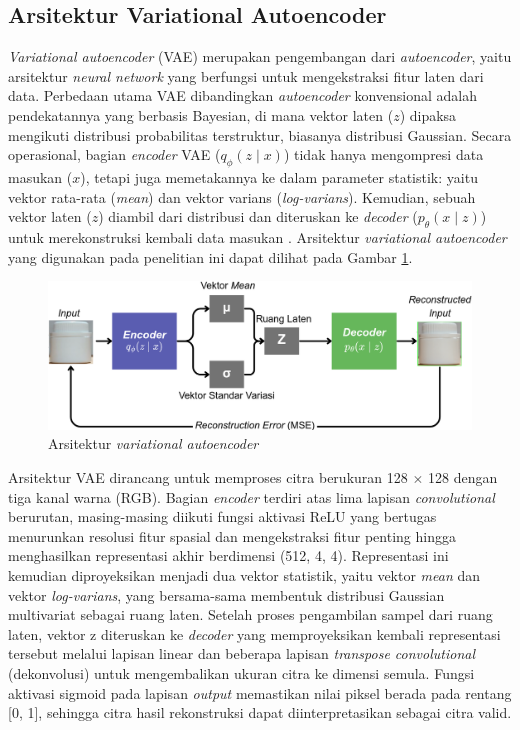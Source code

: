 \subsection{Arsitektur Variational Autoencoder}
\textit{Variational autoencoder} (VAE) merupakan pengembangan dari
\textit{autoencoder}, yaitu arsitektur \textit{neural network}
yang berfungsi untuk mengekstraksi fitur laten dari data. Perbedaan
utama VAE dibandingkan \textit{autoencoder} konvensional adalah
pendekatannya yang berbasis Bayesian, di mana vektor laten ($z$)
dipaksa mengikuti distribusi probabilitas terstruktur, biasanya
distribusi Gaussian. Secara operasional, bagian \textit{encoder} VAE
($q_{\phi}(z \mid x)$) tidak hanya mengompresi data masukan ($x$),
tetapi juga memetakannya ke dalam parameter statistik: yaitu vektor
rata-rata (\textit{mean}) dan vektor varians (\textit{log-varians}).
Kemudian, sebuah vektor laten ($z$) diambil dari distribusi dan
diteruskan ke \textit{decoder} ($p_{\theta}(x \mid z)$) untuk
merekonstruksi kembali data masukan \citep{25}. Arsitektur
\textit{variational autoencoder} yang
digunakan pada penelitian ini dapat dilihat pada Gambar
\ref{fig:arsitektur-autoencoder}.

\begin{figure}[H]
  \centering
  \includegraphics[width=\textwidth]{gambar/arsitektur_autoencoder.png}
  \caption{Arsitektur \textit{variational autoencoder}}
  \label{fig:arsitektur-autoencoder}
\end{figure}
\vspace{-1em}

Arsitektur VAE dirancang untuk memproses citra berukuran 128 $\times$
128 dengan tiga kanal warna (RGB). Bagian \textit{encoder}
terdiri atas lima lapisan
\textit{convolutional} berurutan, masing-masing diikuti fungsi
aktivasi ReLU yang bertugas menurunkan
resolusi fitur spasial dan mengekstraksi fitur penting hingga
menghasilkan representasi akhir berdimensi (512, 4, 4). Representasi
ini kemudian diproyeksikan menjadi dua vektor statistik, yaitu vektor
\textit{mean} dan vektor \textit{log-varians}, yang bersama-sama
membentuk distribusi
Gaussian multivariat sebagai ruang laten. Setelah proses pengambilan
sampel dari ruang laten, vektor z diteruskan ke \textit{decoder} yang
memproyeksikan kembali representasi tersebut melalui lapisan linear
dan beberapa lapisan \textit{transpose convolutional} (dekonvolusi) untuk
mengembalikan ukuran citra ke dimensi semula. Fungsi aktivasi
sigmoid pada lapisan \textit{output} memastikan nilai piksel berada pada
rentang [0, 1], sehingga citra hasil rekonstruksi dapat
diinterpretasikan sebagai citra valid.

